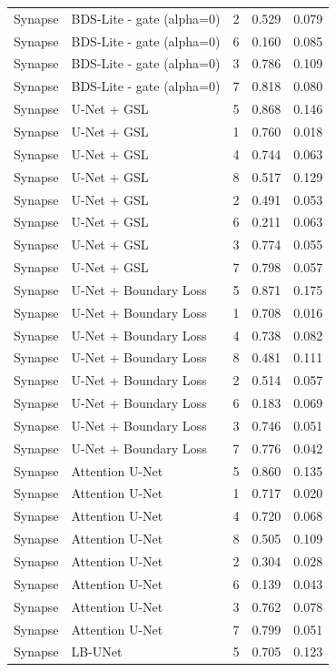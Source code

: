 \begin{tabular}{lllll}
Synapse & BDS-Lite - gate (alpha=0) & 2 & 0.529 & 0.079 \\
Synapse & BDS-Lite - gate (alpha=0) & 6 & 0.160 & 0.085 \\
Synapse & BDS-Lite - gate (alpha=0) & 3 & 0.786 & 0.109 \\
Synapse & BDS-Lite - gate (alpha=0) & 7 & 0.818 & 0.080 \\
Synapse & U-Net + GSL & 5 & 0.868 & 0.146 \\
Synapse & U-Net + GSL & 1 & 0.760 & 0.018 \\
Synapse & U-Net + GSL & 4 & 0.744 & 0.063 \\
Synapse & U-Net + GSL & 8 & 0.517 & 0.129 \\
Synapse & U-Net + GSL & 2 & 0.491 & 0.053 \\
Synapse & U-Net + GSL & 6 & 0.211 & 0.063 \\
Synapse & U-Net + GSL & 3 & 0.774 & 0.055 \\
Synapse & U-Net + GSL & 7 & 0.798 & 0.057 \\
Synapse & U-Net + Boundary Loss & 5 & 0.871 & 0.175 \\
Synapse & U-Net + Boundary Loss & 1 & 0.708 & 0.016 \\
Synapse & U-Net + Boundary Loss & 4 & 0.738 & 0.082 \\
Synapse & U-Net + Boundary Loss & 8 & 0.481 & 0.111 \\
Synapse & U-Net + Boundary Loss & 2 & 0.514 & 0.057 \\
Synapse & U-Net + Boundary Loss & 6 & 0.183 & 0.069 \\
Synapse & U-Net + Boundary Loss & 3 & 0.746 & 0.051 \\
Synapse & U-Net + Boundary Loss & 7 & 0.776 & 0.042 \\
Synapse & Attention U-Net & 5 & 0.860 & 0.135 \\
Synapse & Attention U-Net & 1 & 0.717 & 0.020 \\
Synapse & Attention U-Net & 4 & 0.720 & 0.068 \\
Synapse & Attention U-Net & 8 & 0.505 & 0.109 \\
Synapse & Attention U-Net & 2 & 0.304 & 0.028 \\
Synapse & Attention U-Net & 6 & 0.139 & 0.043 \\
Synapse & Attention U-Net & 3 & 0.762 & 0.078 \\
Synapse & Attention U-Net & 7 & 0.799 & 0.051 \\
Synapse & LB-UNet & 5 & 0.705 & 0.123 \\

\end{tabular}

